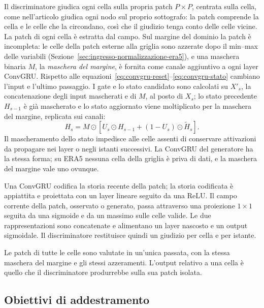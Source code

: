 Il discriminatore giudica ogni cella sulla propria patch $P\times P$, centrata sulla cella, come nell'articolo giudica ogni nodo sul proprio sottografo: la patch comprende la cella e le celle che la circondano, così che il giudizio tenga conto delle celle vicine. La patch di ogni cella è estratta dal campo. Sul margine del dominio la patch è incompleta: le celle della patch esterne alla griglia sono azzerate dopo il min--max delle variabili (Sezione~\ref{sec:ingresso-normalizzazione-era5}), e una maschera binaria $M$, la \emph{maschera del margine}, è fornita come canale aggiuntivo a ogni layer ConvGRU. Rispetto alle equazioni~\eqref{eq:convgru-reset}--\eqref{eq:convgru-stato} cambiano l'input e l'ultimo passaggio. I gate e lo stato candidato sono calcolati su $X'_s$, la concatenazione degli input mascherati e di $M$, al posto di $X_s$; lo stato precedente $H_{s-1}$ è già mascherato e lo stato aggiornato viene moltiplicato per la maschera del margine, replicata sui canali:
\begin{equation}
H_s = M\odot\left[U_s\odot H_{s-1}+(1-U_s)\odot\widetilde{H}_s\right].
\end{equation}
Il mascheramento dello stato impedisce alle celle assenti di conservare attivazioni da propagare nei layer o negli istanti successivi. La ConvGRU del generatore ha la stessa forma; su ERA5 nessuna cella della griglia è priva di dati, e la maschera del margine vale uno ovunque.

Una ConvGRU codifica la storia recente della patch; la storia codificata è appiattita e proiettata con un layer lineare seguito da una ReLU. Il campo corrente della patch, osservato o generato, passa attraverso una proiezione $1\times1$ seguita da una sigmoide e da un massimo sulle celle valide. Le due rappresentazioni sono concatenate e alimentano un layer nascosto e un output sigmoidale. Il discriminatore restituisce quindi un giudizio per cella e per istante.

Le patch di tutte le celle sono valutate in un'unica passata, con la stessa maschera del margine e gli stessi azzeramenti. L'output relativo a una cella è quello che il discriminatore produrrebbe sulla sua patch isolata.

\subsection{Obiettivi di addestramento}
\label{sec:stgan-obiettivi}

